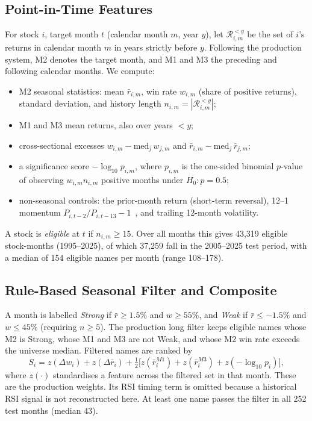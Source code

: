 \documentclass[conference]{IEEEtran}
\begin{document}
\subsection{Point-in-Time Features}
For stock $i$, target month $t$ (calendar month $m$, year $y$), let $\mathcal{R}_{i,m}^{<y}$ be the set of $i$'s returns in calendar month $m$ in years strictly before $y$. Following the production system, M2 denotes the target month, and M1 and M3 the preceding and following calendar months. We compute:
\begin{itemize}
\item M2 seasonal statistics: mean $\bar r_{i,m}$, win rate $w_{i,m}$ (share of positive returns), standard deviation, and history length $n_{i,m}=|\mathcal{R}_{i,m}^{<y}|$;
\item M1 and M3 mean returns, also over years $<y$;
\item cross-sectional excesses $w_{i,m}-\mathrm{med}_j\,w_{j,m}$ and $\bar r_{i,m}-\mathrm{med}_j\,\bar r_{j,m}$;
\item a significance score $-\log_{10}p_{i,m}$, where $p_{i,m}$ is the one-sided binomial $p$-value of observing $w_{i,m}n_{i,m}$ positive months under $H_0\!:\!p=0.5$;
\item non-seasonal controls: the prior-month return (short-term reversal), 12--1 momentum $P_{i,t-2}/P_{i,t-13}-1$~\cite{jegadeesh1993}, and trailing 12-month volatility.
\end{itemize}
A stock is \emph{eligible} at $t$ if $n_{i,m}\ge 15$. Over all months this gives 43{,}319 eligible stock-months (1995--2025), of which 37{,}259 fall in the 2005--2025 test period, with a median of 154 eligible names per month (range 108--178).

\subsection{Rule-Based Seasonal Filter and Composite}
A month is labelled \emph{Strong} if $\bar r\ge 1.5\%$ and $w\ge 55\%$, and \emph{Weak} if $\bar r\le -1.5\%$ and $w\le 45\%$ (requiring $n\ge5$). The production long filter keeps eligible names whose M2 is Strong, whose M1 and M3 are not Weak, and whose M2 win rate exceeds the universe median. Filtered names are ranked by
\begin{equation}
S_i \!=\! z(\Delta w_i) \!+\! z(\Delta \bar r_i) \!+\! \tfrac12\big[z(\bar r^{M1}_i) \!+\! z(\bar r^{M3}_i) \!+\! z(-\log_{10}p_i)\big],
\label{eq:zscore}
\end{equation}
where $z(\cdot)$ standardises a feature across the filtered set in that month. These are the production weights. Its RSI timing term is omitted because a historical RSI signal is not reconstructed here. At least one name passes the filter in all 252 test months (median 43).
\end{document}
